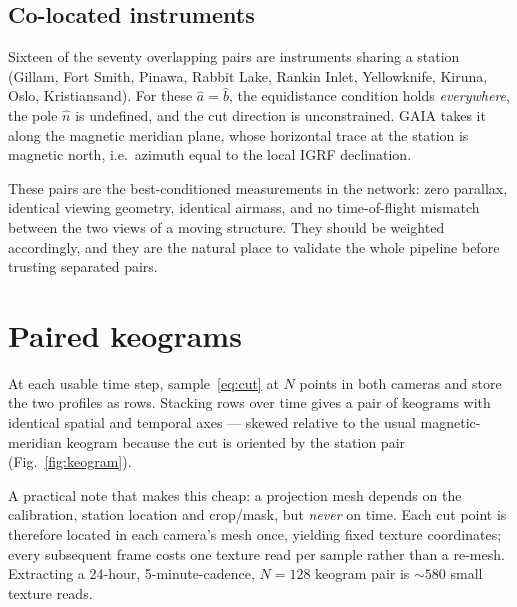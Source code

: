 \documentclass[11pt,a4paper]{article}
\begin{document}
\subsection{Co-located instruments}

Sixteen of the seventy overlapping pairs are instruments sharing a station
(Gillam, Fort Smith, Pinawa, Rabbit Lake, Rankin Inlet, Yellowknife, Kiruna,
Oslo, Kristiansand). For these $\hat a=\hat b$, the equidistance condition holds
\emph{everywhere}, the pole $\hat n$ is undefined, and the cut direction is
unconstrained. GAIA takes it along the magnetic meridian plane, whose horizontal
trace at the station is magnetic north, i.e.\ azimuth equal to the local IGRF
declination.

These pairs are the best-conditioned measurements in the network: zero
parallax, identical viewing geometry, identical airmass, and no time-of-flight
mismatch between the two views of a moving structure. They should be weighted
accordingly, and they are the natural place to validate the whole pipeline
before trusting separated pairs.

\section{Paired keograms}

At each usable time step, sample~\eqref{eq:cut} at $N$ points in both cameras
and store the two profiles as rows. Stacking rows over time gives a pair of
keograms with identical spatial and temporal axes --- skewed relative to the
usual magnetic-meridian keogram because the cut is oriented by the station pair
(Fig.~\ref{fig:keogram}).

A practical note that makes this cheap: a projection mesh depends on the
calibration, station location and crop/mask, but \emph{never} on time. Each cut
point is therefore located in each camera's mesh once, yielding fixed texture
coordinates; every subsequent frame costs one texture read per sample rather
than a re-mesh. Extracting a 24-hour, 5-minute-cadence, $N=128$ keogram pair is
$\sim\!580$ small texture reads.
\end{document}
